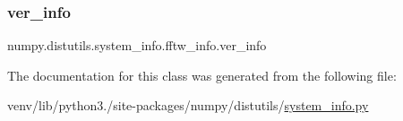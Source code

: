 \subsubsection{\texorpdfstring{ver\+\_\+info}{ver\_info}}
{\footnotesize\ttfamily numpy.\+distutils.\+system\+\_\+info.\+fftw\+\_\+info.\+ver\+\_\+info\hspace{0.3cm}{\ttfamily [static]}}



The documentation for this class was generated from the following file\+:\begin{DoxyCompactItemize}
\item 
venv/lib/python3./site-\/packages/numpy/distutils/\hyperlink{system__info_8py}{system\+\_\+info.\+py}\end{DoxyCompactItemize}
